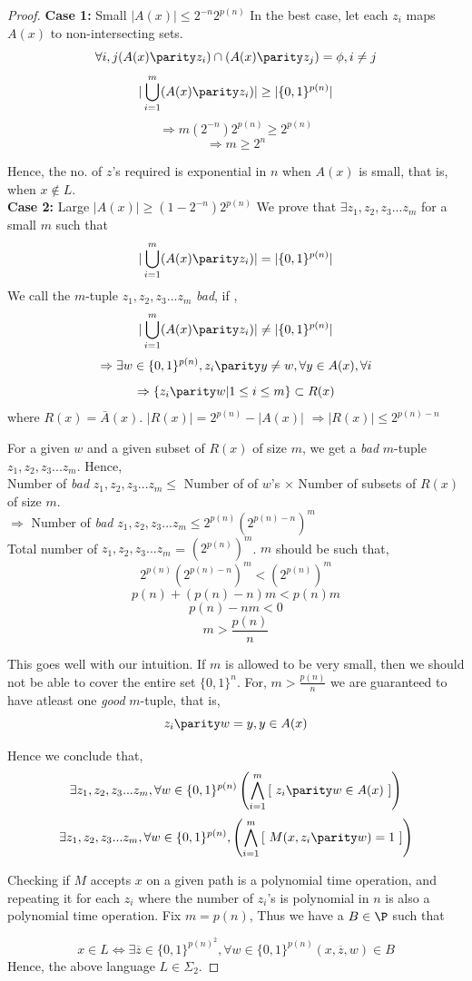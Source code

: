 \begin{proof}
\textbf{Case 1:} Small $|A(x)| \leq 2^{-n} 2^{p(n)}$
In the best case, let each $z_i$ maps $A(x)$ to non-intersecting sets.
\[ \forall i, j (A(x)\parity z_i) \cap (A(x) \parity z_j) = \phi , i \neq j \]
\[|\bigcup_{i=1}^{m} (A(x) \parity z_i)| \geq |\{0,1\}^{p(n)}|\]
\[\Rightarrow m (2^{-n}) 2^{p(n)} \geq 2^{p(n)}\]
\[\Rightarrow m \geq 2^n\]

Hence, the no. of $z$'s required is exponential in $n$ when $A(x)$ is small, that is, when
$x \notin L$.
\\

\textbf{Case 2:} Large $|A(x)| \geq (1 - 2^{-n}) 2^{p(n)}$
We prove that $\exists z_1, z_2, z_3 ... z_m$ for a small $m$ such that 
\[|\bigcup_{i=1}^{m} (A(x) \parity z_i)| = |\{0,1\}^{p(n)}|\]
We call the $m$-tuple $z_1, z_2, z_3 ... z_m$ {\em bad}, if ,
\[|\bigcup_{i=1}^{m} (A(x) \parity z_i)| \neq |\{0,1\}^{p(n)}|\]
\[\Rightarrow \exists w \in \{0,1\}^{p(n)}, z_i \parity y \neq w ,\forall y \in
A(x), \forall i \]
\[\Rightarrow \{z_i \parity w | 1 \leq i \leq m \} \subset R(x)\]
where $R(x) = \bar A(x)$.
$|R(x)| = 2^{p(n)} - |A(x)|$
$\Rightarrow |R(x)| \leq  2^{p(n) - n}$

For a given $w$ and a given subset of $R(x)$ of size $m$, we get a {\em bad} $m$-tuple
$z_1, z_2, z_3 ... z_m$. Hence,
\\
Number of {\em bad} $z_1, z_2, z_3 ... z_m \leq $ Number of of $w$'s $\times$ Number of subsets
of $R(x)$ of size $m$.
\\
$\Rightarrow$ Number of {\em bad} $z_1, z_2, z_3 ... z_m \leq 2^{p(n)} (2 ^{p(n)-n})^m $
\\
Total number of $z_1, z_2, z_3 ... z_m $ = $(2^{p(n)})^m$.
$m$ should be such that,
\[2^{p(n)} (2 ^{p(n)-n})^m < (2^{p(n)})^m\]
\[p(n) + (p(n)-n)m < p(n)m\]
\[p(n) - nm < 0\]
\[m > \frac{p(n)}{n}\]

This goes well with our intuition. If $m$ is allowed to be very small, then we should not be able to cover the entire set $\{0,1\}^n$. For, $m > \frac{p(n)}{n}$ we are guaranteed to have atleast one {\em good} $m$-tuple, that is,
\[z_i \parity w = y , y \in A(x)\]

Hence we conclude that, 
\[\exists z_1, z_2, z_3 ... z_m , \forall w \in \{0,1\}^{p(n)} \left( \bigwedge_{i=1}^{m} \left[~z_i \parity w
\in A(x) ~\right] \right) \]
\[\exists z_1, z_2, z_3 ... z_m , \forall w \in \{0,1\}^{p(n)}, \left( \bigwedge_{i=1}^{m} \left[ ~M(x, z_i
\parity w) = 1 ~\right] \right) \]

Checking if $M$ accepts $x$ on a given path is a polynomial time operation, and
repeating it for each $z_i$ where the number of $z_i$'s is polynomial in $n$ is
also a polynomial time operation. Fix $m = p(n)$, Thus we have a $B \in \P$ such that

\[ x \in L \iff \exists \overline{z} \in \{0,1\}^{p(n)^2}, \forall w \in \{0,1\}^{p(n)} (x,\overline{z},w) \in B \]
Hence, the above language $L \in \Sigma_2$.
\end{proof}
  

